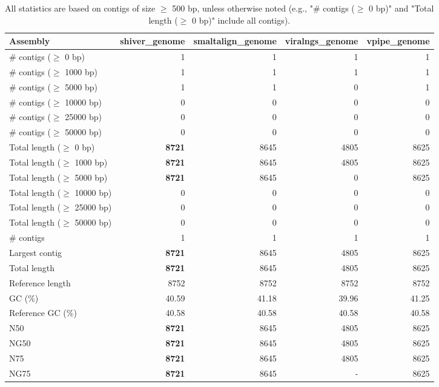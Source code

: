 \documentclass[12pt,a4paper]{article}
\begin{document}
\begin{table}[ht]
\begin{center}
\caption{All statistics are based on contigs of size $\geq$ 500 bp, unless otherwise noted (e.g., "\# contigs ($\geq$ 0 bp)" and "Total length ($\geq$ 0 bp)" include all contigs).}
\begin{tabular}{|l*{4}{|r}|}
\hline
Assembly & shiver\_genome & smaltalign\_genome & viralngs\_genome & vpipe\_genome \\ \hline
\# contigs ($\geq$ 0 bp) & 1 & 1 & 1 & 1 \\ \hline
\# contigs ($\geq$ 1000 bp) & 1 & 1 & 1 & 1 \\ \hline
\# contigs ($\geq$ 5000 bp) & 1 & 1 & 0 & 1 \\ \hline
\# contigs ($\geq$ 10000 bp) & 0 & 0 & 0 & 0 \\ \hline
\# contigs ($\geq$ 25000 bp) & 0 & 0 & 0 & 0 \\ \hline
\# contigs ($\geq$ 50000 bp) & 0 & 0 & 0 & 0 \\ \hline
Total length ($\geq$ 0 bp) & {\bf 8721} & 8645 & 4805 & 8625 \\ \hline
Total length ($\geq$ 1000 bp) & {\bf 8721} & 8645 & 4805 & 8625 \\ \hline
Total length ($\geq$ 5000 bp) & {\bf 8721} & 8645 & 0 & 8625 \\ \hline
Total length ($\geq$ 10000 bp) & 0 & 0 & 0 & 0 \\ \hline
Total length ($\geq$ 25000 bp) & 0 & 0 & 0 & 0 \\ \hline
Total length ($\geq$ 50000 bp) & 0 & 0 & 0 & 0 \\ \hline
\# contigs & 1 & 1 & 1 & 1 \\ \hline
Largest contig & {\bf 8721} & 8645 & 4805 & 8625 \\ \hline
Total length & {\bf 8721} & 8645 & 4805 & 8625 \\ \hline
Reference length & 8752 & 8752 & 8752 & 8752 \\ \hline
GC (\%) & 40.59 & 41.18 & 39.96 & 41.25 \\ \hline
Reference GC (\%) & 40.58 & 40.58 & 40.58 & 40.58 \\ \hline
N50 & {\bf 8721} & 8645 & 4805 & 8625 \\ \hline
NG50 & {\bf 8721} & 8645 & 4805 & 8625 \\ \hline
N75 & {\bf 8721} & 8645 & 4805 & 8625 \\ \hline
NG75 & {\bf 8721} & 8645 & - & 8625 \\ \hline

\end{tabular}
\end{center}
\end{table}
\end{document}
